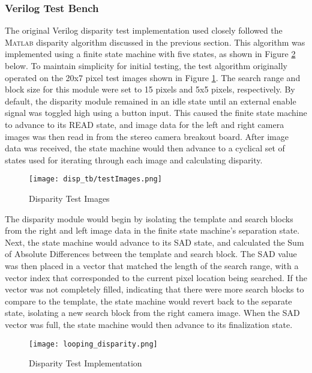 \subsubsection{Verilog Test Bench}
The original Verilog disparity test implementation used closely followed the \textsc{Matlab} disparity algorithm discussed in the previous section. This algorithm was implemented using a finite state machine with five states, as shown in Figure \ref{disparityTestImp} below. To maintain simplicity for initial testing, the test algorithm originally operated on the 20x7 pixel test images shown in Figure \ref{disparityTestImg}. The search range and block size for this module were set to 15 pixels and 5x5 pixels, respectively. By default, the disparity module remained in an idle state until an external enable signal was toggled high using a button input. This caused the finite state machine to advance to its READ state, and image data for the left and right camera images was then read in from the stereo camera breakout board. After image data was received, the state machine would then advance to a cyclical set of states used for iterating through each image and calculating disparity. 
\par
\begin{figure}[H]
	\centerline{\texttt{[image: disp\_tb/testImages.png]}}
	\caption{Disparity Test Images}
	\label{disparityTestImg}
\end{figure}
The disparity module would begin by isolating the template and search blocks from the right and left image data in the finite state machine's separation state. Next, the state machine would advance to its SAD state, and calculated the Sum of Absolute Differences between the template and search block. The SAD value was then placed in a vector that matched the length of the search range, with a vector index that corresponded to the current pixel location being searched. If the vector was not completely filled, indicating that there were more search blocks to compare to the template, the state machine would revert back to the separate state, isolating a new search block from the right camera image. When the SAD vector was full, the state machine would then advance to its finalization state. 
\par
\begin{figure}[H]
	\centerline{\texttt{[image: looping\_disparity.png]}}
	\caption{Disparity Test Implementation}
	\label{disparityTestImp}
\end{figure}
\par
